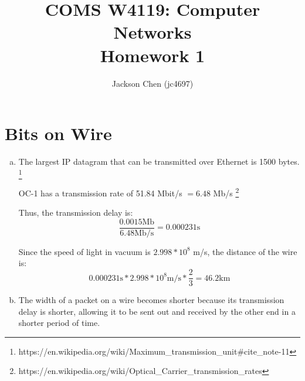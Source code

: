 \documentclass[11pt]{article}
\begin{document}

\title{COMS W4119: Computer Networks\\
       Homework 1}
\author{Jackson Chen (jc4697)} %
\maketitle

\section*{Bits on Wire}
  \begin{enumerate}[(a)]
    \item
      The largest IP datagram that can be transmitted over Ethernet is 1500 bytes. \footnote{https://en.wikipedia.org/wiki/Maximum\_transmission\_unit\#cite\_note-11}

      OC-1 has a transmission rate of 51.84 Mbit/s $= 6.48$ Mb/s \footnote{https://en.wikipedia.org/wiki/Optical\_Carrier\_transmission\_rates}

      Thus, the transmission delay is:
      \[ \frac{0.0015 \text{Mb}}{6.48 \text{Mb/s}} = 0.000231 \text{s} \]

      Since the speed of light in vacuum is $2.998 * 10^8$ m/s, the distance of the wire is:
      \[ 0.000231 \text{s} * 2.998 * 10^8 \text{m/s} * \frac{2}{3} = \boxed{46.2 \text{km}} \]
    \item
      The width of a packet on a wire becomes shorter because its transmission
      delay is shorter, allowing it to be sent out and received by the other
      end in a shorter period of time.
  \end{enumerate}
\end{document}
